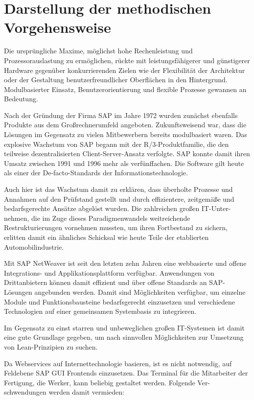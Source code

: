 \section{Darstellung der methodischen Vorgehensweise}\label{sec:methode}

Die ursprüngliche Maxime, möglichst hohe Rechenleistung und Prozessorauslastung zu ermöglichen, rückte mit leistungsfähigerer und günstigerer Hardware gegenüber konkurrierenden Zielen wie der Flexibilität der Architektur oder der Gestaltung benutzerfreundlicher Oberflächen in den Hintergrund. Modulbasierter Einsatz, Benutzerorientierung und flexible Prozesse gewannen an Bedeutung.

Nach der Gründung der Firma SAP im Jahre 1972 wurden zunächst ebenfalls Produkte aus dem Großrechnerumfeld angeboten. Zukunftsweisend war, dass die Lösungen im Gegensatz zu vielen Mitbewerbern bereits modulbasiert waren. Das explosive Wachstum von SAP begann mit der R/3-Produktfamilie, die den teilweise dezentralisierten Client-Server-Ansatz verfolgte. SAP konnte damit ihren Umsatz zwischen 1991 und 1996 mehr als verfünffachen. Die Software gilt heute als einer der De-facto-Standards der Informationstechnologie. 

Auch hier ist das Wachstum damit zu erklären, dass überholte Prozesse und Annahmen auf den Prüfstand gestellt und durch effizientere, zeitgemäße und bedarfsgerechte Ansätze abgelöst wurden. Die zahlreichen großen IT-Unter- nehmen, die im Zuge dieses Paradigmenwandels weitreichende Restrukturierungen vornehmen mussten, um ihren Fortbestand zu sichern, erlitten damit ein ähnliches Schicksal wie heute Teile der etablierten Automobilindustrie. 

Mit SAP NetWeaver ist seit den letzten zehn Jahren eine webbasierte und offene Integrations- und Applikationsplattform verfügbar. Anwendungen von Drittanbietern können damit effizient und über offene Standards an SAP- Lösungen angebunden werden. Damit sind Möglichkeiten verfügbar, um einzelne Module und Funktionsbausteine bedarfsgerecht einzusetzen und verschiedene Technologien auf einer gemeinsamen Systembasis zu integrieren. 

Im Gegensatz zu einst starren und unbeweglichen großen IT-Systemen ist damit eine gute Grundlage gegeben, um nach sinnvollen Möglichkeiten zur Umsetzung von Lean-Prinzipien zu suchen.

Da Webservices auf Internettechnologie basieren, ist es nicht notwendig, auf Feldebene SAP GUI Frontends einzusetzen. Das Terminal für die Mitarbeiter der Fertigung, die Werker, kann beliebig gestaltet werden. Folgende Ver- schwendungen werden damit vermieden:

